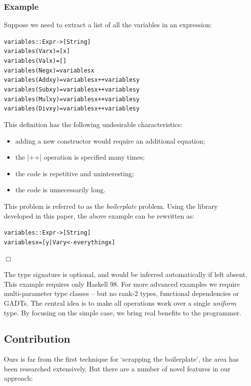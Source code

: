 \documentclass[preprint]{sigplanconf}
\newcounter{exmp}
\newcommand{\yesexample}{\subsubsection*{Example \arabic{exmp}}\refstepcounter{exmp}}
\newcommand{\noexample}{\hfill$\Box$}
\newenvironment{code}{\begin{alltt}\small}{\end{alltt}}
\newenvironment{example}{\yesexample}{\noexample}
\begin{document}
\begin{example}
\label{ex:variables}

Suppose we need to extract a list of all the variables in an expression:

\begin{code}
variables :: Expr -> [String]
variables (Var  x    ) = [x]
variables (Val  x    ) = []
variables (Neg  x    ) = variables x
variables (Add  x y  ) = variables x ++ variables y
variables (Sub  x y  ) = variables x ++ variables y
variables (Mul  x y  ) = variables x ++ variables y
variables (Div  x y  ) = variables x ++ variables y
\end{code}

This definition has the following undesirable characteristics:

\begin{itemize}
\item adding a new constructor would require an additional equation;
\item the |++| operation is specified many times;
\item the code is repetitive and uninteresting;
\item the code is unnecessarily long.
\end{itemize}

This problem is referred to as the \textit{boilerplate} problem. Using the library developed in this paper, the above example can be rewritten as:

\begin{code}
variables :: Expr -> [String]
variables x = [y | Var y <- everything x]
\end{code}
\end{example}

The type signature is optional, and would be inferred automatically if left absent. This example requires only Haskell 98. For more advanced examples we require multi-parameter type classes -- but no rank-2 types, functional dependencies or GADTs. The central idea is to make all operations work over a single \textit{uniform} type. By focusing on the simple case, we bring real benefits to the programmer.

\subsection{Contribution}

Ours is far from the first technique for `scrapping the boilerplate', the area has been researched extensively. But there are a number of novel features in our approach:
\end{document}
